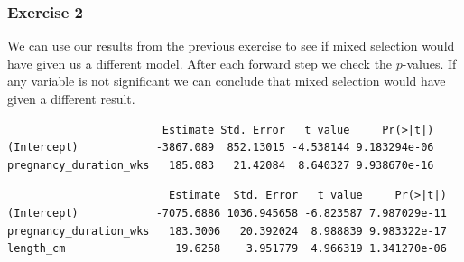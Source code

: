 \documentclass[
  letterpaper,
  DIV=11,
  numbers=noendperiod]{scrreprt}
\newenvironment{Shaded}{\begin{snugshade}}{\end{snugshade}}
\newcommand{\AttributeTok}[1]{\textcolor[rgb]{0.40,0.45,0.13}{#1}}
\newcommand{\CommentTok}[1]{\textcolor[rgb]{0.37,0.37,0.37}{#1}}
\newcommand{\FunctionTok}[1]{\textcolor[rgb]{0.28,0.35,0.67}{#1}}
\newcommand{\NormalTok}[1]{\textcolor[rgb]{0.00,0.23,0.31}{#1}}
\newcommand{\OtherTok}[1]{\textcolor[rgb]{0.00,0.23,0.31}{#1}}
\newcommand{\SpecialCharTok}[1]{\textcolor[rgb]{0.37,0.37,0.37}{#1}}
\begin{document}
\subsubsection{Exercise 2}\label{exercise-2-27}

We can use our results from the previous exercise to see if mixed
selection would have given us a different model. After each forward step
we check the \(p\)-values. If any variable is not significant we can
conclude that mixed selection would have given a different result.

\begin{Shaded}
\end{Shaded}

\begin{verbatim}
                        Estimate Std. Error   t value     Pr(>|t|)
(Intercept)            -3867.089  852.13015 -4.538144 9.183294e-06
pregnancy_duration_wks   185.083   21.42084  8.640327 9.938670e-16
\end{verbatim}

\begin{Shaded}
\end{Shaded}

\begin{verbatim}
                         Estimate  Std. Error   t value     Pr(>|t|)
(Intercept)            -7075.6886 1036.945658 -6.823587 7.987029e-11
pregnancy_duration_wks   183.3006   20.392024  8.988839 9.983322e-17
length_cm                 19.6258    3.951779  4.966319 1.341270e-06
\end{verbatim}
\end{document}

